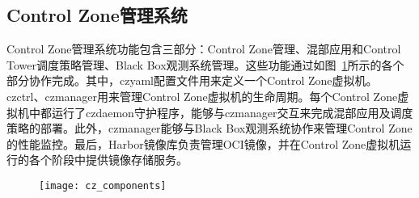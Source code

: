 \subsection{Control Zone管理系统}


Control Zone管理系统功能包含三部分：Control Zone管理、混部应用和Control Tower调度策略管理、Black Box观测系统管理。这些功能通过如图~\ref{fig:cz_components}所示的各个部分协作完成。其中，czyaml配置文件用来定义一个Control Zone虚拟机。czctrl、czmanager用来管理Control Zone虚拟机的生命周期。每个Control Zone虚拟机中都运行了czdaemon守护程序，能够与czmanager交互来完成混部应用及调度策略的部署。此外，czmanager能够与Black Box观测系统协作来管理Control Zone的性能监控。最后，Harbor镜像库\citep{harbor}负责管理OCI镜像，并在Control Zone虚拟机运行的各个阶段中提供镜像存储服务。

\begin{figure}[!htbp]
    \centering
    \texttt{[image: cz\_components]}
    \label{fig:cz_components}
\end{figure}

